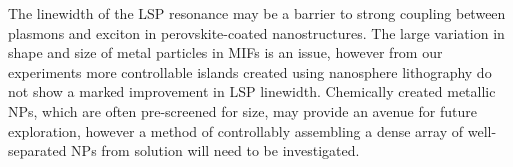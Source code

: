 The linewidth of the LSP resonance may be a barrier to strong coupling between plasmons and exciton in perovskite-coated nanostructures. The large variation in shape and size of metal particles in MIFs is an issue, however from our experiments more controllable islands created using nanosphere lithography do not show a marked improvement in LSP linewidth. Chemically created metallic NPs, which are often pre-screened for size, may provide an avenue for future exploration, however a method of controllably assembling a dense array of well-separated NPs from solution will need to be investigated.